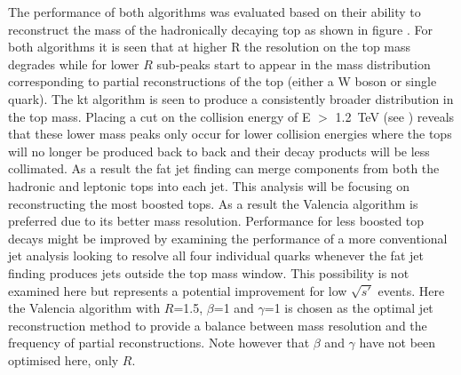 The performance of both algorithms was evaluated based on their ability to reconstruct the mass of the hadronically decaying top as shown in figure . For both algorithms it is seen that at higher R the resolution on the top mass degrades while for lower $R$ sub-peaks start to appear in the mass distribution corresponding to partial reconstructions of the top (either a W boson or single quark). The kt algorithm is seen to produce a consistently broader distribution in the top mass. Placing a cut on the collision energy of E $>$ 1.2~TeV (see ) reveals that these lower mass peaks only occur for lower collision energies where the tops will no longer be produced back to back and their decay products will be less collimated. As a result the fat jet finding can merge components from both the hadronic and leptonic tops into each jet. This analysis will be focusing on reconstructing the most boosted tops. As a result the Valencia algorithm is preferred due to its better mass resolution. Performance for less boosted top decays might be improved by examining the performance of a more conventional jet analysis looking to resolve all four individual quarks whenever the fat jet finding produces jets outside the top mass window. This possibility is not examined here but represents a potential improvement for low $\sqrt{s'}$ events. Here the Valencia algorithm with $R$=1.5, $\beta$=1 and $\gamma$=1 is chosen as the optimal jet reconstruction method to provide a balance between mass resolution and the frequency of partial reconstructions. Note however that $\beta$ and $\gamma$ have not been optimised here, only $R$.

